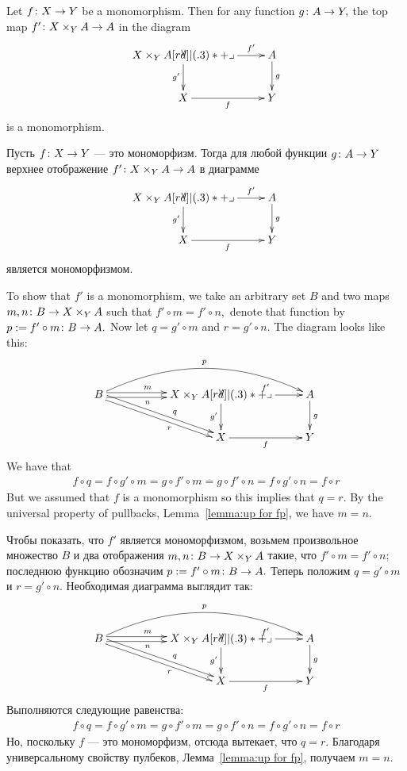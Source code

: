 \documentclass[CT4S-EN-RU]{subfiles}
\begin{document}
\begin{propositionENG}\label{prop:pb preserve mono}
Let $f\colon X\rightarrow Y$ be a monomorphism. Then for any function $g\colon A\rightarrow Y,$ the top map $f'\colon X\times_YA\rightarrow A$ in the diagram
$$
\xymatrix{X\times_YA\ar[r]^-{f'}\ar[d]_{g'}\ullimit&A\ar[d]^g\\X\ar[r]_f&Y}
$$
is a monomorphism.
\end{propositionENG}

\begin{propositionRUS}\label{prop:pb preserve mono}
Пусть $f\colon X\rightarrow Y$ — это мономорфизм. Тогда для любой функции $g\colon A\rightarrow Y$ верхнее отображение $f'\colon X\times_YA\rightarrow A$ в диаграмме
$$
\xymatrix{X\times_YA\ar[r]^-{f'}\ar[d]_{g'}\ullimit&A\ar[d]^g\\X\ar[r]_f&Y}
$$
является мономорфизмом.
\end{propositionRUS}

\begin{proofENG}
To show that $f'$ is a monomorphism, we take an arbitrary set $B$ and two maps $m,n\colon B\rightarrow X\times_YA$ such that $f'\circ m=f'\circ n,$ denote that function by $p:=f'\circ m\colon B\rightarrow A.$ Now let $q=g'\circ m$ and $r=g'\circ n.$ The diagram looks like this:
$$
\xymatrix{B\ar@<.5ex>[rr]^(.4)m\ar@<-.5ex>[rr]_(.4)n\ar@/^2pc/[rrr]^p\ar@<.5ex>[drr]^(.6)q\ar@<-.5ex>[drr]_(.6)r&&X\times_YA\ar[r]^{f'}\ar[d]_{g'}\ullimit&A\ar[d]^g\\&&X\ar[r]_f&Y}
$$
We have that 
\begin{align*}f\circ q=f\circ g'\circ m=g\circ f'\circ m=g\circ f'\circ n=f\circ g'\circ n=f\circ r\end{align*} 
But we assumed that $f$ is a monomorphism so this implies that $q=r.$ By the universal property of pullbacks, Lemma~\ref{lemma:up for fp}, we have $m=n.$
\end{proofENG}

\begin{proofRUS}
Чтобы показать, что $f'$ является мономорфизмом, возьмем произвольное множество $B$ и два отображения $m,n\colon B\rightarrow X\times_YA$ такие, что $f'\circ m=f'\circ n$; последнюю функцию обозначим $p:=f'\circ m\colon B\rightarrow A.$ Теперь положим $q=g'\circ m$ и $r=g'\circ n.$ Необходимая диаграмма выглядит так:
$$
\xymatrix{B\ar@<.5ex>[rr]^(.4)m\ar@<-.5ex>[rr]_(.4)n\ar@/^2pc/[rrr]^p\ar@<.5ex>[drr]^(.6)q\ar@<-.5ex>[drr]_(.6)r&&X\times_YA\ar[r]^{f'}\ar[d]_{g'}\ullimit&A\ar[d]^g\\&&X\ar[r]_f&Y}
$$
Выполняются следующие равенства:
\begin{align*}f\circ q=f\circ g'\circ m=g\circ f'\circ m=g\circ f'\circ n=f\circ g'\circ n=f\circ r\end{align*} 
Но, поскольку $f$ — это мономорфизм, отсюда вытекает, что $q=r.$ Благодаря универсальному свойству пулбеков, Лемма~\ref{lemma:up for fp}, получаем $m=n.$
\end{proofRUS}
\end{document}
